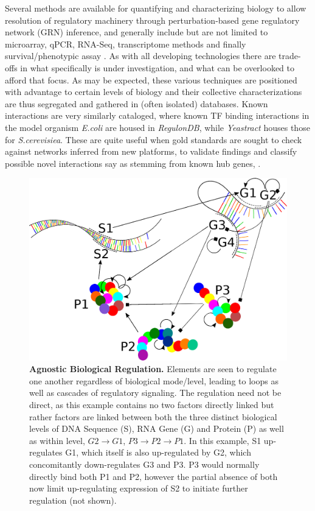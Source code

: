 Several methods are available for quantifying and characterizing biology to allow resolution of regulatory machinery through perturbation-based gene regulatory network (GRN) inference, and generally include but are not limited to microarray, qPCR, RNA-Seq, transcriptome methods and finally survival/phenotypic assay \citep{ideker1999discovery,bansal2007infer,castelo2009reverse,cosgrove2008predicting}. As with all developing technologies there are trade-offs in what specifically is under investigation, and what can be overlooked to afford that focus. As may be expected, these various techniques are positioned with advantage to certain levels of biology and their collective characterizations are thus segregated and gathered in (often isolated) databases. Known interactions are very similarly cataloged, where known TF binding interactions in the model organism \emph{E.coli} are housed in \emph{RegulonDB}\citep{gama2008regulondb}, while \emph{Yeastract}\citep{teixeira2006yeastract} houses those for \emph{S.cerevisiea}. These are quite useful when gold standards are sought to check against networks inferred from new platforms, to validate findings and classify possible novel interactions \eg say as stemming from known hub genes, \etc.

\begin{figure}%
\centering
\includegraphics[width=1\linewidth]{2/DNA2.eps}
\caption{\textbf{Agnostic Biological Regulation.} Elements are seen to regulate one another regardless of biological mode/level, leading to loops as well as cascades of regulatory signaling. The regulation need not be direct, as this example contains no two factors directly linked but rather factors are linked between both the three distinct biological levels of DNA Sequence (S), RNA Gene (G) and Protein (P) as well as within level, \ie $G2\to G1$, $P3\to P2\to P1$. In this example, S1 up-regulates G1, which itself is also up-regulated by G2, which concomitantly down-regulates G3 and P3. P3 would normally directly bind both P1 and P2, however the partial absence of both now limit up-regulating expression of S2 to initiate further regulation (not shown).
}
\label{fig:DNA}
\end{figure}


